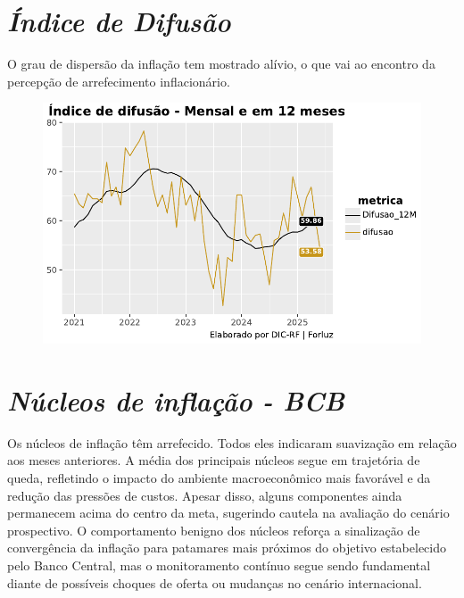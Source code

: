 \documentclass[
  letterpaper,
  DIV=11,
  numbers=noendperiod]{scrartcl}
\begin{document}
\hypertarget{uxedndice-de-difusuxe3o}{%
\section{\texorpdfstring{\emph{Índice de
Difusão}}{Índice de Difusão}}\label{uxedndice-de-difusuxe3o}}

O grau de dispersão da inflação tem mostrado alívio, o que vai ao
encontro da percepção de arrefecimento inflacionário.

\begin{figure}

{\centering \includegraphics{IPCAForluz_files/figure-pdf/cell-9-output-1.pdf}

}

\end{figure}

\hypertarget{nuxfacleos-de-inflauxe7uxe3o---bcb}{%
\section{\texorpdfstring{\emph{Núcleos de inflação -
BCB}}{Núcleos de inflação - BCB}}\label{nuxfacleos-de-inflauxe7uxe3o---bcb}}

Os núcleos de inflação têm arrefecido. Todos eles indicaram suavização
em relação aos meses anteriores. A média dos principais núcleos segue em
trajetória de queda, refletindo o impacto do ambiente macroeconômico
mais favorável e da redução das pressões de custos. Apesar disso, alguns
componentes ainda permanecem acima do centro da meta, sugerindo cautela
na avaliação do cenário prospectivo. O comportamento benigno dos núcleos
reforça a sinalização de convergência da inflação para patamares mais
próximos do objetivo estabelecido pelo Banco Central, mas o
monitoramento contínuo segue sendo fundamental diante de possíveis
choques de oferta ou mudanças no cenário internacional.
\end{document}
